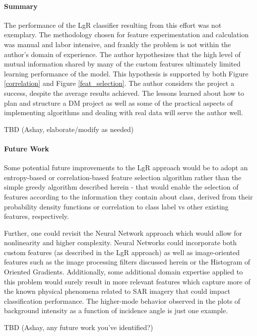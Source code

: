 \documentclass[fleqn,10pt]{SelfArx} %
\begin{document}
\paragraph{Summary}
The performance of the LgR classifier resulting from this effort was not exemplary.  The methodology chosen for feature experimentation and calculation was manual and labor intensive, and frankly the problem is not within the author's domain of experience.  The author hypothesizes that the high level of mutual information shared by many of the custom features ultimately limited learning performance of the model.  This hypothesis is supported by both Figure \ref{correlation} and Figure \ref{feat_selection}.  The author considers the project a success, despite the average results achieved.  The lessons learned about how to plan and structure a DM project as well as some of the practical aspects of implementing algorithms and dealing with real data will serve the author well.

TBD (Ashay, elaborate/modify as needed)

\paragraph{Future Work}
Some potential future improvements to the LgR approach would be to adopt an entropy-based or correlation-based feature selection algorithm rather than the simple greedy algorithm described herein - that would enable the selection of features according to the information they contain about class, derived from their probability density functions or correlation to class label vs other existing features, respectively.  

Further, one could revisit the Neural Network approach which would allow for nonlinearity and higher complexity.  Neural Networks could incorporate both custom features (as described in the LgR approach) as well as image-oriented features such as the image processing filters discussed herein or the Histogram of Oriented Gradients.  Additionally, some additional domain expertise applied to this problem would surely result in more relevant features which capture more of the known physical phenomena related to SAR imagery that could impact classification performance.  The higher-mode behavior observed in the plots of background intensity as a function of incidence angle is just one example.

TBD (Ashay, any future work you've identified?)
\end{document}
